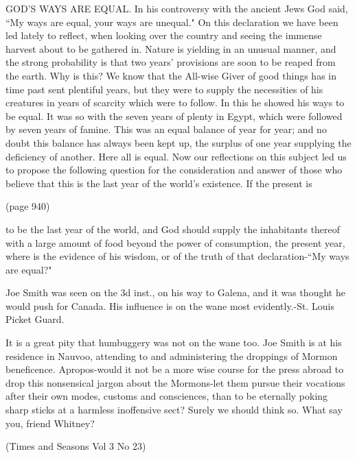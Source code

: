 GOD'S WAYS ARE EQUAL. In his controversy with the ancient Jews God said, ``My ways are
equal, your ways are unequal." On this declaration we have been led lately to
reflect, when looking over the country and seeing the immense harvest about to be
gathered in. Nature is yielding in an unusual manner, and the strong probability is
that two years' provisions are soon to be reaped from the earth. Why is this? We know
that the All-wise Giver of good things has in time past sent plentiful years, but
they were to supply the necessities of his creatures in years of scarcity which were
to follow. In this he showed his ways to be equal. It was so with the seven years of
plenty in Egypt, which were followed by seven years of famine. This was an equal
balance of year for year; and no doubt this balance has always been kept up, the
surplus of one year supplying the deficiency of another. Here all is equal. Now our
reflections on this subject led us to propose the following question for the
consideration and answer of those who believe that this is the last year of the
world's existence. If the present is

(page 940)

to be the last year of the world, and God should supply the inhabitants thereof with
a large amount of food beyond the power of consumption, the present year, where is
the evidence of his wisdom, or of the truth of that declaration-``My ways are
equal?"

Joe Smith was seen on the 3d inst., on his way to Galena, and it was thought he would 
push for Canada. His influence is on the wane most evidently.-St. Louis Picket Guard.

It is a great pity that humbuggery was not on the wane too. Joe Smith is at his 
residence in Nauvoo, attending to and administering the droppings of Mormon 
beneficence. Apropos-would it not be a more wise course for the press abroad 
to drop this nonsensical jargon about the Mormons-let them pursue their vocations 
after their own modes, customs and consciences, than to be eternally poking sharp 
sticks at a harmless inoffensive sect? Surely we should think so. What say you, 
friend Whitney?

(Times and Seasons Vol 3 No 23)